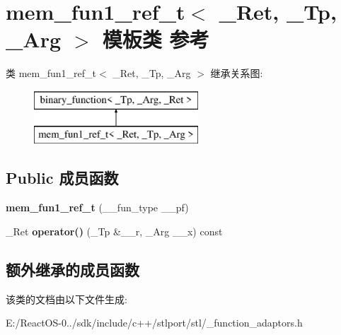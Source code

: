 \hypertarget{classmem__fun1__ref__t}{}\section{mem\+\_\+fun1\+\_\+ref\+\_\+t$<$ \+\_\+\+Ret, \+\_\+\+Tp, \+\_\+\+Arg $>$ 模板类 参考}
\label{classmem__fun1__ref__t}
类 mem\+\_\+fun1\+\_\+ref\+\_\+t$<$ \+\_\+\+Ret, \+\_\+\+Tp, \+\_\+\+Arg $>$ 继承关系图\+:\begin{figure}[H]
\begin{center}
\leavevmode
\includegraphics[height=2.000000cm]{classmem__fun1__ref__t}
\end{center}
\end{figure}
\subsection*{Public 成员函数}
\begin{DoxyCompactItemize}
\item 
\mbox{\label{classmem__fun1__ref__t_a39f82f1dc09879e7541a5a3cd9c48697}} 
{\bfseries mem\+\_\+fun1\+\_\+ref\+\_\+t} (\+\_\+\+\_\+fun\+\_\+type \+\_\+\+\_\+pf)
\item 
\mbox{\label{classmem__fun1__ref__t_a682836500a577b45bcdacbb1a1517398}} 
\+\_\+\+Ret {\bfseries operator()} (\+\_\+\+Tp \&\+\_\+\+\_\+r, \+\_\+\+Arg \+\_\+\+\_\+x) const
\end{DoxyCompactItemize}
\subsection*{额外继承的成员函数}


该类的文档由以下文件生成\+:\begin{DoxyCompactItemize}
\item 
E\+:/\+React\+O\+S-\/0../sdk/include/c++/stlport/stl/\+\_\+function\+\_\+adaptors.\+h\end{DoxyCompactItemize}
